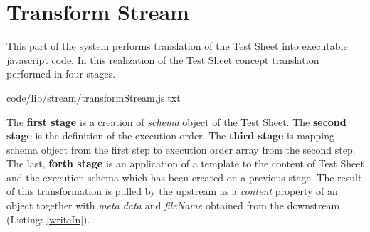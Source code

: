 %
%


\section{Transform Stream}
\label{sec:transform}
This part of the system performs translation of the Test Sheet into executable javascript code. In this realization of the Test Sheet concept translation performed in four stages. 



{code/lib/stream/transformStream.js.txt}

The\textbf{ first stage} is a creation of \textit{schema} object of the Test Sheet. The \textbf{second stage} is the definition of the execution order. The \textbf{third stage} is mapping schema object from the first step to execution order array from the second step. The last, \textbf{forth stage} is an application of a template to the content of Test Sheet and the execution schema which has been created on a previous stage. The result of this transformation is pulled by the upstream as a \textit{content} property of an object together with \textit{meta data} and \textit{fileName} obtained from the downstream (Listing: \ref{writeIn}).

